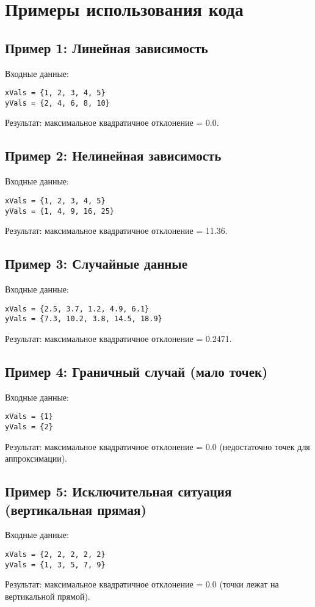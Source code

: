 \section{Примеры использования кода}

\subsection{Пример 1: Линейная зависимость}
Входные данные:
\begin{lstlisting}
xVals = {1, 2, 3, 4, 5}
yVals = {2, 4, 6, 8, 10}
\end{lstlisting}
Результат: максимальное квадратичное отклонение = 0.0.

\subsection{Пример 2: Нелинейная зависимость}
Входные данные:
\begin{lstlisting}
xVals = {1, 2, 3, 4, 5}
yVals = {1, 4, 9, 16, 25}
\end{lstlisting}
Результат: максимальное квадратичное отклонение = 11.36.

\subsection{Пример 3: Случайные данные}
Входные данные:
\begin{lstlisting}
xVals = {2.5, 3.7, 1.2, 4.9, 6.1}
yVals = {7.3, 10.2, 3.8, 14.5, 18.9}
\end{lstlisting}
Результат: максимальное квадратичное отклонение = 0.2471.

\subsection{Пример 4: Граничный случай (мало точек)}
Входные данные:
\begin{lstlisting}
xVals = {1}
yVals = {2}
\end{lstlisting}
Результат: максимальное квадратичное отклонение = 0.0 (недостаточно точек для аппроксимации).

\subsection{Пример 5: Исключительная ситуация (вертикальная прямая)}
Входные данные:
\begin{lstlisting}
xVals = {2, 2, 2, 2, 2}
yVals = {1, 3, 5, 7, 9}
\end{lstlisting}
Результат: максимальное квадратичное отклонение = 0.0 (точки лежат на вертикальной прямой).